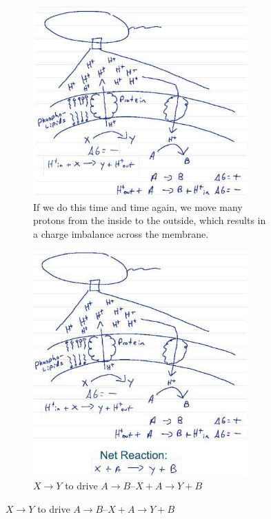 \documentclass[]{article}
\begin{document}
\begin{figure}[H]
\begin{subfigure}[t]{0.45\textwidth}
	\end{subfigure}
	\begin{subfigure}[t]{0.45\textwidth}
		\caption{ If we do this time and time again, we move many protons from the inside to the outside, which results in a charge imbalance across the membrane.}\label{fig:ChemioOsmosis2}
		\includegraphics[width=0.9\textwidth]{ChemioOsmosis2}
	\end{subfigure}
	\;\;
	\begin{subfigure}[t]{0.45\textwidth}
		\caption{$X\rightarrow Y$ to drive $A\rightarrow B$--$X+A\rightarrow Y+B$}\label{fig:ChemioOsmosis3}
		\includegraphics[width=0.9\textwidth]{ChemioOsmosis3}
	\end{subfigure}
\end{figure}
\end{document}
